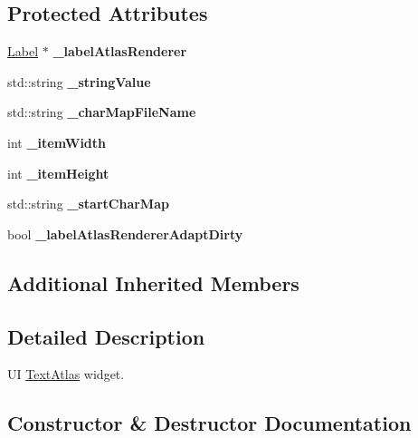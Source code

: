 \subsection*{Protected Attributes}
\begin{DoxyCompactItemize}
\item 
\mbox{\label{classui_1_1TextAtlas_a3649267a7cafe8b62261aef9f76b4f18}} 
\hyperlink{classLabel}{Label} $\ast$ {\bfseries \+\_\+label\+Atlas\+Renderer}
\item 
\mbox{\label{classui_1_1TextAtlas_a961adec6ee9411b825f76b6812573147}} 
std\+::string {\bfseries \+\_\+string\+Value}
\item 
\mbox{\label{classui_1_1TextAtlas_a6195203cc8f1b87ecf5ce54e15fe2132}} 
std\+::string {\bfseries \+\_\+char\+Map\+File\+Name}
\item 
\mbox{\label{classui_1_1TextAtlas_aff0efe96ae3a5e5aa95dd8f6dccb5350}} 
int {\bfseries \+\_\+item\+Width}
\item 
\mbox{\label{classui_1_1TextAtlas_a554c9bce35d607d2098cd209b2fa7e03}} 
int {\bfseries \+\_\+item\+Height}
\item 
\mbox{\label{classui_1_1TextAtlas_a8155ff809f288d8bae229117437808d3}} 
std\+::string {\bfseries \+\_\+start\+Char\+Map}
\item 
\mbox{\label{classui_1_1TextAtlas_ae6c86a9b4eaad76d9865de6bea2883a7}} 
bool {\bfseries \+\_\+label\+Atlas\+Renderer\+Adapt\+Dirty}
\end{DoxyCompactItemize}
\subsection*{Additional Inherited Members}


\subsection{Detailed Description}
UI \hyperlink{classui_1_1TextAtlas}{Text\+Atlas} widget. 

\subsection{Constructor \& Destructor Documentation}
\mbox{\label{classui_1_1TextAtlas_a10e8abf999ff03704e3d8ba2f44487d2}} 
